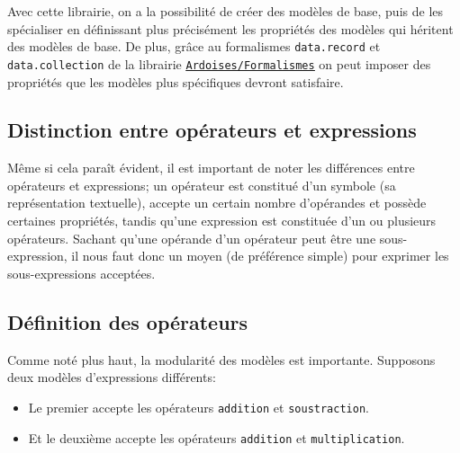 \documentclass{article}
\begin{document}
\noindent Avec cette librairie, on a la possibilité de créer des modèles de base, puis de les spécialiser en définissant plus précisément les propriétés des modèles qui héritent des modèles de base. De plus, grâce au formalismes \lstinline|data.record| et \lstinline|data.collection| de la librairie \underline{\href{https://github.com/ardoises/formalisms}{\lstinline|Ardoises/Formalismes|}} on peut imposer des propriétés que les modèles plus spécifiques devront satisfaire.

\subsection{Distinction entre opérateurs et expressions}
Même si cela paraît évident, il est important de noter les différences entre opérateurs et expressions; un opérateur est constitué d'un symbole (sa représentation textuelle), accepte un certain nombre d'opérandes et possède certaines propriétés, tandis qu'une expression est constituée d'un ou plusieurs opérateurs. Sachant qu'une opérande d'un opérateur peut être une sous-expression, il nous faut donc un moyen (de préférence simple) pour exprimer les sous-expressions acceptées.

\subsection{Définition des opérateurs}
Comme noté plus haut, la modularité des modèles est importante. Supposons deux modèles d'expressions différents:

\begin{itemize}
	\item Le premier accepte les opérateurs \lstinline|addition| et \lstinline|soustraction|.
	\item Et le deuxième accepte les opérateurs \lstinline|addition| et \lstinline|multiplication|.
\end{itemize}
\end{document}
